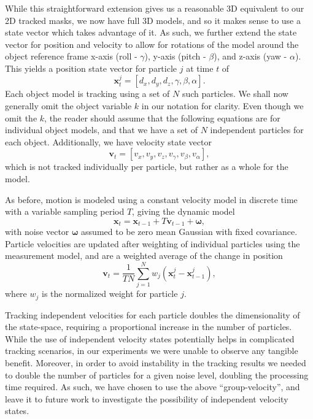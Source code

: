 While this straightforward extension gives us a reasonable 3D equivalent to our 2D tracked masks, we now have full 3D models, and so it makes sense to use a state vector which takes advantage of it. As such, we further extend the state vector for position and velocity to allow for rotations of the model around the object reference frame x-axis (roll - $\gamma$), y-axis (pitch - $\beta$), and z-axis (yaw - $\alpha$). This yields a position state vector for particle $j$ at time $t$ of 
\begin{equation} 
 \mathbf{x}^j_t = [d_x, d_y, d_z, \gamma, \beta, \alpha].
\end{equation}
Each object model is tracking using a set of $N$ such particles. We shall now generally omit the object variable $k$ in our notation for clarity. Even though we omit the $k$, the reader should assume that the following equations are for individual object models, and that we have a set of $N$ independent particles for each object.
Additionally, we have velocity state vector 
\begin{equation} 
 \mathbf{v}_t = [v_x, v_y, v_z, v_{\gamma}, v_{\beta}, v_{\alpha}],
\end{equation}
which is not tracked individually per particle, but rather as a whole for the model.

As before, motion is modeled using a constant velocity model in discrete time with a variable sampling period $\mathit{T}$, giving the dynamic model
\begin{equation} 
\mathbf{x}_t = \mathbf{x}_{t-1} + \mathit{T}\mathbf{v}_{t-1} + \mathbf{\omega} , 
\end{equation}
with noise vector $\mathbf{\omega}$ assumed to be zero mean Gaussian with fixed covariance.
Particle velocities are updated after weighting of individual particles using the measurement model, and are a weighted average of the change in position
\begin{equation} 
\label{Eqn:group_vel}
\mathbf{v}_t = \frac{1}{\mathit{T}N} \sum_{j=1}^{N} w_j (\mathbf{x}^j_{t} - \mathbf{x}^j_{t-1}), 
\end{equation}
where $w_j$ is the normalized weight for particle $j$. 

Tracking independent velocities for each particle doubles the dimensionality of the state-space, requiring a proportional increase in the number of particles. While the use of independent velocity states potentially helps in complicated tracking scenarios, in our experiments we were unable to observe any tangible benefit. Moreover, in order to avoid instability in the tracking results we needed to double the number of particles for a given noise level, doubling the processing time required. As such, we have chosen to use the above ``group-velocity'', and leave it to future work to investigate the possibility of independent velocity states.

